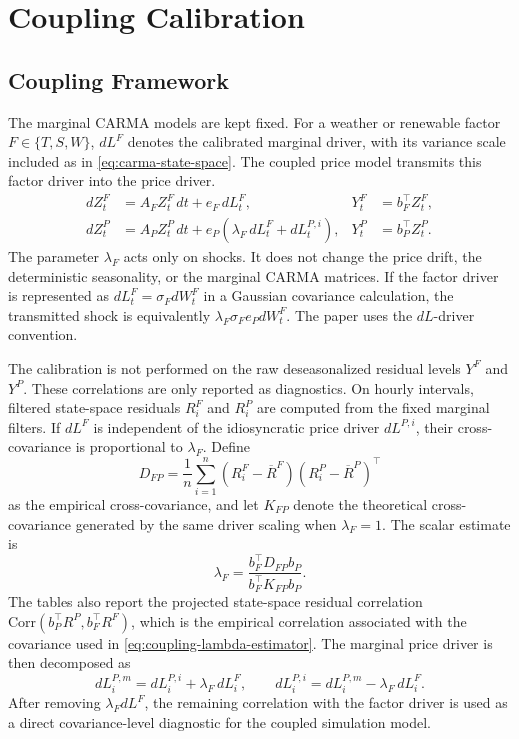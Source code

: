 \section{Coupling Calibration}\label{sec:coupling-calibration}

\subsection{Coupling Framework}\label{ssec:coupling-framework}

The marginal CARMA models are kept fixed. For a weather or renewable factor
\(F\in\{T,S,W\}\), \(dL^F\) denotes the calibrated marginal driver, with its
variance scale included as in \cref{eq:carma-state-space}. The coupled price
model transmits this factor driver into the price driver.
\begin{align}
  dZ_t^F
  &=
  A_F Z_t^F\,dt+e_F\,dL_t^F,
  &
  Y_t^F &= b_F^\top Z_t^F,
  \nonumber \\
  dZ_t^P
  &=
  A_P Z_t^P\,dt
  +
  e_P\left(\lambda_F\,dL_t^F+dL_t^{P,i}\right),
  &
  Y_t^P &= b_P^\top Z_t^P .
  \label{eq:coupling-state-space}
\end{align}
The parameter \(\lambda_F\) acts only on shocks. It does not change the price
drift, the deterministic seasonality, or the marginal CARMA matrices. If the
factor driver is represented as \(dL_t^F=\sigma_F dW_t^F\) in a Gaussian
covariance calculation, the transmitted shock is equivalently
\(\lambda_F\sigma_F e_P dW_t^F\). The paper uses the \(dL\)-driver convention.

The calibration is not performed on the raw deseasonalized residual levels
\(Y^F\) and \(Y^P\). These correlations are only reported as diagnostics. On
hourly intervals, filtered state-space residuals \(R_i^F\) and \(R_i^P\) are
computed from the fixed marginal filters. If \(dL^F\) is independent of the
idiosyncratic price driver \(dL^{P,i}\), their cross-covariance is proportional
to \(\lambda_F\). Define
\[
  D_{FP}
  =
  \frac{1}{n}\sum_{i=1}^{n}
  (R_i^F-\overline R^F)
  (R_i^P-\overline R^P)^\top
\]
as the empirical cross-covariance, and let \(K_{FP}\) denote the theoretical
cross-covariance generated by the same driver scaling when \(\lambda_F=1\).
The scalar estimate is
\begin{equation}
  \lambda_F
  =
  \frac{b_F^\top D_{FP} b_P}
       {b_F^\top K_{FP} b_P}.
  \label{eq:coupling-lambda-estimator}
\end{equation}
The tables also report the projected state-space residual correlation
\(\mathrm{Corr}(b_P^\top R^P,b_F^\top R^F)\), which is the empirical
correlation associated with the covariance used in
\cref{eq:coupling-lambda-estimator}.
The marginal price driver is then decomposed as
\begin{equation}
  dL_i^{P,m}
  =
  dL_i^{P,i}
  +
  \lambda_F\,dL_i^F,
  \qquad
  dL_i^{P,i}
  =
  dL_i^{P,m}
  -
  \lambda_F\,dL_i^F .
  \label{eq:coupling-driver-decomposition}
\end{equation}
After removing \(\lambda_F dL^F\), the remaining correlation with the factor
driver is used as a direct covariance-level diagnostic for the coupled
simulation model.

